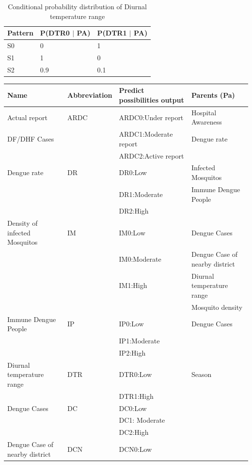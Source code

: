 \documentclass[review]{elsarticle}
\begin{document}
	\begin{table}[!htbp]
		\centering
		\normalsize
		\begin{tabular}{|l|l|l|}
			\hline
			Pattern & P(DTR0 $\mid$  PA) & P(DTR1 $\mid$  PA)\\
			\hline
			S0 & 0 & 1\\
			\hline
			S1 & 1 & 0\\
			\hline
			S2 & 0.9 & 0.1\\
			\hline
		\end{tabular}
		\caption{Conditional probability distribution of Diurnal temperature range}
	\end{table}
	
	\begin{table}[!htbp]
		\centering
		\normalsize
		\begin{tabular}{|l|l|l|l|}
			\hline
			Name & Abbreviation & Predict possibilities output & Parents (Pa)\\
			\hline
			Actual report & ARDC & ARDC0:Under report &  Hospital Awareness \\
			DF/DHF Cases &  & ARDC1:Moderate report &  Dengue rate\\
			&  & ARDC2:Active report & \\
			\hline
			Dengue rate & DR & DR0:Low &  Infected Mosquitos \\
			&  & DR1:Moderate &  Immune Dengue People\\
			&  & DR2:High & \\
			\hline
			Density of infected Mosquitos & IM & IM0:Low  &  Dengue Cases \\
			&  & IM0:Moderate &  Dengue Case of nearby district\\
			&  & IM1:High &  Diurnal temperature range\\
			&  &  &  Mosquito density\\
			\hline
			Immune Dengue People & IP & IP0:Low &  Dengue Cases \\
			&  & IP1:Moderate & \\
			&  & IP2:High & \\
			\hline
			Diurnal temperature range & DTR & DTR0:Low &  Season \\
			&  & DTR1:High & \\
			\hline
			Dengue Cases & DC & DC0:Low & \\
			&  & DC1: Moderate & \\
			&  & DC2:High & \\
			\hline
			Dengue Case of nearby district & DCN & DCN0:Low & \\

\end{tabular}
\end{table}
\end{document}
